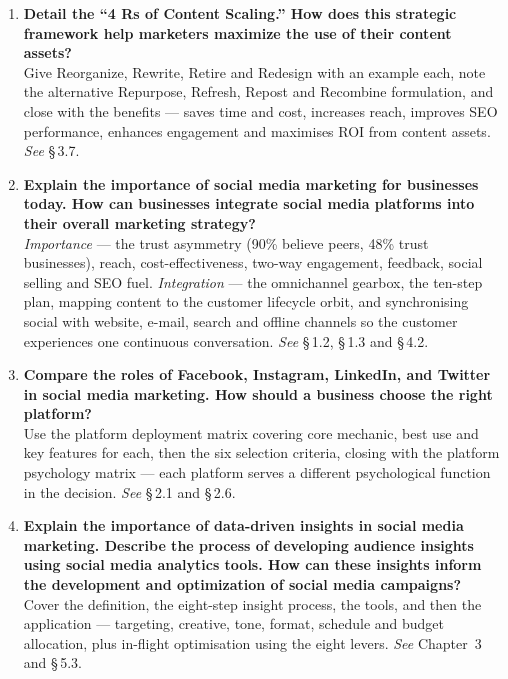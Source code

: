 \begin{enumerate}[leftmargin=2.2em,itemsep=1.4ex]
\item \textbf{Detail the ``4 Rs of Content Scaling.'' How does this strategic
      framework help marketers maximize the use of their content assets?}
      \\
      Give Reorganize, Rewrite, Retire and Redesign with an example each, note
      the alternative Repurpose, Refresh, Repost and Recombine formulation, and
      close with the benefits --- saves time and cost, increases reach, improves
      SEO performance, enhances engagement and maximises ROI from content
      assets. \hfill\emph{See} \S\,3.7.

\item \textbf{Explain the importance of social media marketing for businesses
      today. How can businesses integrate social media platforms into their
      overall marketing strategy?} \\
      \emph{Importance} --- the trust asymmetry (90\% believe peers, 48\% trust
      businesses), reach, cost-effectiveness, two-way engagement, feedback,
      social selling and SEO fuel. \emph{Integration} --- the omnichannel
      gearbox, the ten-step plan, mapping content to the customer lifecycle
      orbit, and synchronising social with website, e-mail, search and offline
      channels so the customer experiences one continuous conversation.
      \hfill\emph{See} \S\,1.2, \S\,1.3 and \S\,4.2.

\item \textbf{Compare the roles of Facebook, Instagram, LinkedIn, and Twitter in
      social media marketing. How should a business choose the right platform?}
      \\
      Use the platform deployment matrix covering core mechanic, best use and key
      features for each, then the six selection criteria, closing with the
      platform psychology matrix --- each platform serves a different
      psychological function in the decision. \hfill\emph{See} \S\,2.1 and
      \S\,2.6.

\item \textbf{Explain the importance of data-driven insights in social media
      marketing. Describe the process of developing audience insights using
      social media analytics tools. How can these insights inform the
      development and optimization of social media campaigns?}
      \\
      Cover the definition, the eight-step insight process, the tools, and then
      the application --- targeting, creative, tone, format, schedule and budget
      allocation, plus in-flight optimisation using the eight levers.
      \hfill\emph{See} Chapter~3 and \S\,5.3.


\end{enumerate}
